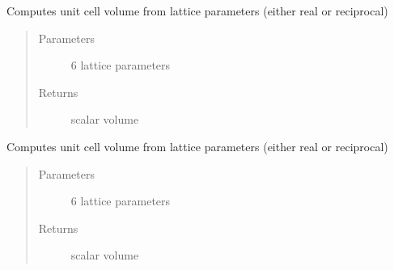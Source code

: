 \documentclass[letterpaper,10pt,english]{sphinxmanual}
\begin{document}

\begin{fulllineitems}
\label{\detokenize{Simulation_Module:LaueTools.CrystalParameters.VolumeCell}}
Computes unit cell volume from lattice parameters (either real or reciprocal)
\begin{quote}\begin{description}
\item[{Parameters}] \leavevmode
{} \textendash{} 6 lattice parameters

\item[{Returns}] \leavevmode
scalar volume

\end{description}\end{quote}

\end{fulllineitems}


\begin{fulllineitems}
Computes unit cell volume from lattice parameters (either real or reciprocal)
\begin{quote}\begin{description}
\item[{Parameters}] \leavevmode
{} \textendash{} 6 lattice parameters

\item[{Returns}] \leavevmode
scalar volume

\end{description}\end{quote}

\end{fulllineitems}

\end{document}
